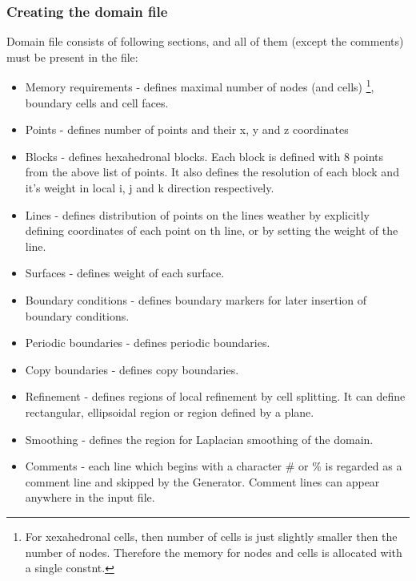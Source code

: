 \documentclass[10pt]{article}
\newcommand*{\tc}{\ttfamily} %
\newcommand*{\tn}{\sffamily} %
\begin{document}
    \subsubsection{Creating the domain file}
    Domain file consists of following sections, and all of them
    (except the comments) must be present in the file:
    \begin{itemize}
    \item[1.] Memory requirements - defines maximal number of nodes
              (and cells)
    \footnote{For xexahedronal cells, then number of cells is just 
              slightly smaller then the number of nodes. Therefore
              the memory for nodes and cells is allocated with a single
              constnt.}, 
              boundary cells and cell faces.  
    \item[2.] Points - defines number of points and their x, y and
              z coordinates
    \item[3.] Blocks - defines hexahedronal blocks. Each block is 
              defined with 8 points from the above list of points.
              It also defines the resolution of each block and it's
              weight in local i, j and k direction respectively.
    \item[4.] Lines - defines distribution of points on the lines
              weather by explicitly defining coordinates of each 
              point on th line, or by setting the weight of the line.
    \item[5.] Surfaces - defines weight of each surface.
    \item[6.] Boundary conditions - defines boundary markers for later
              insertion of boundary conditions.
    \item[7.] Periodic boundaries - defines periodic boundaries.
    \item[8.] Copy boundaries - defines copy boundaries.
    \item[9.] Refinement - defines regions of local refinement by 
              cell splitting. It can define rectangular, ellipsoidal
              region or region defined by a plane. 
    \item[10.] Smoothing - defines the region for Laplacian smoothing
              of the domain. 
    \item Comments - each line which begins with a character {\tc \#}
          or {\tc \%} is regarded as a comment line and skipped by the
          {\tn Generator}. Comment lines can appear anywhere in the
          input file.
    \end{itemize}
\end{document}

